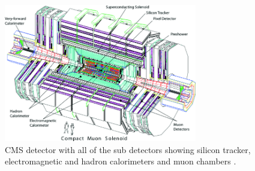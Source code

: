 \begin{itemize}

\end{itemize}

\begin{figure}[!htp]
\centering
\includegraphics[width=0.75\textwidth]{ashish_thesis/cms_exp.png}
\caption[CMS experiment design]{%
   CMS detector with all of the sub detectors showing silicon tracker, electromagnetic and hadron calorimeters and muon chambers \cite{CMS:2008xjf}. 
}
\label{fig:cms}
\end{figure}


